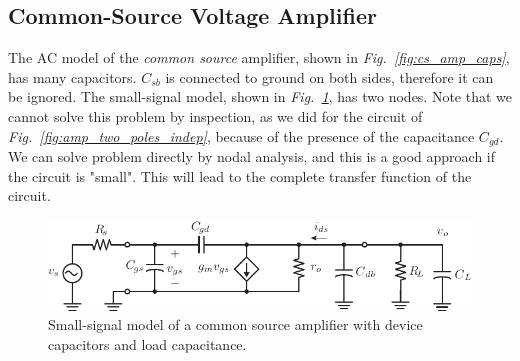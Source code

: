 \subsection{Common-Source Voltage Amplifier}
The AC model of the \textit{common source} amplifier, shown in \emph{Fig.~\ref{fig:cs_amp_caps}}, has many capacitors.  $C_{sb}$ is connected to ground on both sides, therefore it can be ignored.  The small-signal model, shown in \emph{Fig.~\ref{fig:cs_amp_ac_caps}}, has two nodes.  Note that we cannot solve this problem by inspection, as we did for the circuit of \emph{Fig.~\ref{fig:amp_two_poles_indep}}, because of the presence of the capacitance $C_{gd}$. We can solve problem directly by nodal analysis, and this is a good approach if the circuit is "small".  This will lead to the complete transfer function of the circuit.
\begin{figure}[H]
\centering
\includegraphics[scale=1.15]{cs_amp_ac_caps}
\caption{Small-signal model of a common source amplifier with device capacitors and load capacitance.}
\label{fig:cs_amp_ac_caps}
\end{figure}
\newpage
